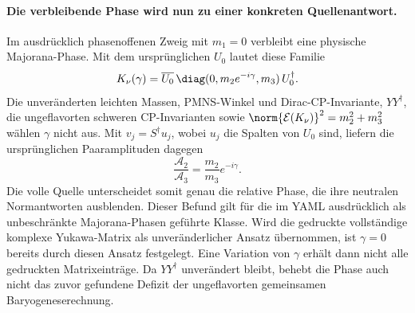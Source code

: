 \paragraph{Die verbleibende Phase wird nun zu einer konkreten Quellenantwort.}
Im ausdrücklich phasenoffenen Zweig mit $m_1=0$ verbleibt eine physische
Majorana-Phase. Mit dem ursprünglichen $U_0$ lautet diese Familie
\begin{equation}
 K_\nu(\gamma)=\overline{U_0}\,\diag(0,m_2e^{-i\gamma},m_3)\,U_0^\dagger.
\end{equation}
Die unveränderten leichten Massen, PMNS-Winkel und Dirac-CP-Invariante,
$YY^\dagger$, die ungeflavorten schweren CP-Invarianten sowie
$\norm{\mathcal E(K_\nu)}^2=m_2^2+m_3^2$ wählen $\gamma$ nicht aus.
Mit $v_j=S^\dagger u_j$, wobei $u_j$ die Spalten von $U_0$ sind,
liefern die ursprünglichen Paaramplituden dagegen
\begin{equation}\label{eq:majoranaphaseresponse}
 \frac{\mathcal A_2}{\mathcal A_3}
 =\frac{m_2}{m_3}e^{-i\gamma}.
\end{equation}
Die volle Quelle unterscheidet somit genau die relative Phase, die ihre
neutralen Normantworten ausblenden. Dieser Befund gilt für die im YAML
ausdrücklich als unbeschränkte Majorana-Phasen geführte Klasse.
Wird die gedruckte vollständige komplexe Yukawa-Matrix als unveränderlicher
Ansatz übernommen, ist $\gamma=0$ bereits durch diesen Ansatz festgelegt.
Eine Variation von $\gamma$ erhält dann nicht alle gedruckten Matrixeinträge.
Da $YY^\dagger$ unverändert bleibt, behebt die Phase auch nicht das zuvor
gefundene Defizit der ungeflavorten gemeinsamen Baryogeneserechnung.


